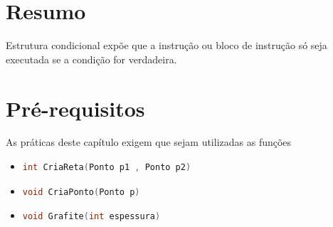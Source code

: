 \section*{Resumo}

Estrutura condicional expõe que a instrução ou bloco de instrução só seja executada se a condição for verdadeira.

\section*{Pré-requisitos}

As práticas deste capítulo exigem que sejam utilizadas as funções
\begin{itemize}
  \item 
    \begin{lstlisting}[language=C++]
    int CriaReta(Ponto p1 , Ponto p2)
    \end{lstlisting}

  \item
    \begin{lstlisting}[language=C++]
    void CriaPonto(Ponto p)
    \end{lstlisting}

  \item
    \begin{lstlisting}[language=C++]
    void Grafite(int espessura)
    \end{lstlisting}
 
\end{itemize}


%







